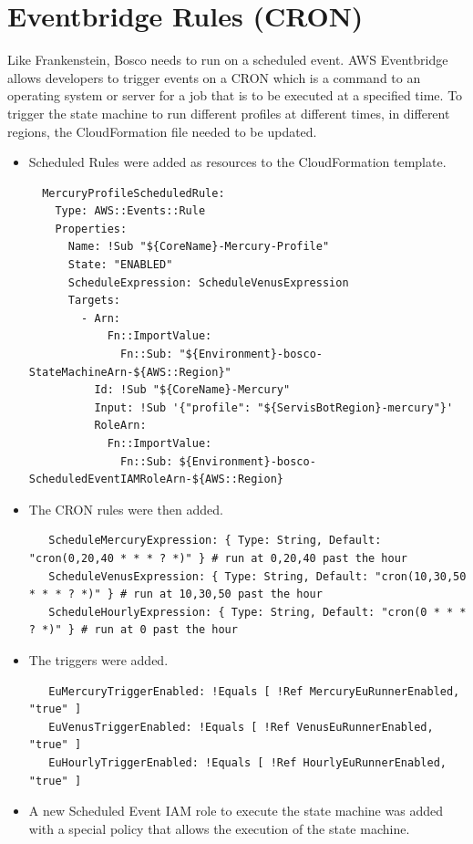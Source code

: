 \documentclass[12pt,a4paper,titlepage]{report}
\begin{document}
\section{Eventbridge Rules (CRON) }

Like Frankenstein, Bosco needs to run on a scheduled event. AWS Eventbridge allows developers to trigger events on a CRON which is a command to an operating system or server for a job that is to be executed at a specified time. 
To trigger the state machine to run different profiles at different times, in different regions, the  CloudFormation file needed to be updated. 
\begin{itemize}
 \item Scheduled Rules were added as resources to the CloudFormation template.
 \begin{tcolorbox}
  \begin{verbatim}
  MercuryProfileScheduledRule:
    Type: AWS::Events::Rule
    Properties:
      Name: !Sub "${CoreName}-Mercury-Profile"
      State: "ENABLED"
      ScheduleExpression: ScheduleVenusExpression
      Targets:
        - Arn: 
            Fn::ImportValue: 
              Fn::Sub: "${Environment}-bosco-StateMachineArn-${AWS::Region}"
          Id: !Sub "${CoreName}-Mercury"
          Input: !Sub '{"profile": "${ServisBotRegion}-mercury"}'
          RoleArn: 
            Fn::ImportValue:
              Fn::Sub: ${Environment}-bosco-ScheduledEventIAMRoleArn-${AWS::Region}
  \end{verbatim}
 \end{tcolorbox}
 \item The CRON rules were then added.
  \begin{tcolorbox}
   \begin{verbatim}
   ScheduleMercuryExpression: { Type: String, Default: "cron(0,20,40 * * * ? *)" } # run at 0,20,40 past the hour
   ScheduleVenusExpression: { Type: String, Default: "cron(10,30,50 * * * ? *)" } # run at 10,30,50 past the hour
   ScheduleHourlyExpression: { Type: String, Default: "cron(0 * * * ? *)" } # run at 0 past the hour
   \end{verbatim}
  \end{tcolorbox}

 \item The triggers were added.
 \begin{tcolorbox}
  \begin{verbatim}
   EuMercuryTriggerEnabled: !Equals [ !Ref MercuryEuRunnerEnabled, "true" ]
   EuVenusTriggerEnabled: !Equals [ !Ref VenusEuRunnerEnabled, "true" ]
   EuHourlyTriggerEnabled: !Equals [ !Ref HourlyEuRunnerEnabled, "true" ]
  \end{verbatim}
 \end{tcolorbox}
 \item A new Scheduled Event IAM role to execute the state machine was added with a special policy that allows the execution of the state machine. 
 

\end{itemize}
\end{document}
